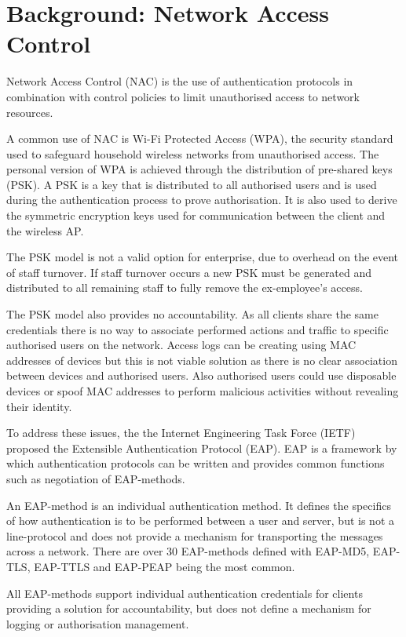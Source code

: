 \chapter{Background: Network Access Control}
Network Access Control (NAC) is the use of authentication protocols in combination with control policies to limit unauthorised access to network resources. \cite{cisco_why_nac}

A common use of NAC is Wi-Fi Protected Access (WPA), the security standard used to safeguard household wireless networks from unauthorised access. The personal version of WPA is achieved through the distribution of pre-shared keys (PSK). A PSK is a key that is distributed to all authorised users and is used during the authentication process to prove authorisation. It is also used to derive the symmetric encryption keys used for communication between the client and the wireless AP.

The PSK model is not a valid option for enterprise\cite{juniper_psk}, due to overhead on the event of staff turnover. If staff turnover occurs a new PSK must be generated and distributed to all remaining staff to fully remove the ex-employee's access. 

The PSK model also provides no accountability. As all clients share the same credentials there is no way to associate performed actions and traffic to specific authorised users on the network. Access logs can be creating using MAC addresses of devices but this is not viable solution as there is no clear association between devices and authorised users. Also authorised users could use disposable devices or spoof MAC addresses to perform malicious activities without revealing their identity.

To address these issues, the the Internet Engineering Task Force (IETF)\cite{ietf} proposed the Extensible Authentication Protocol (EAP)\cite{rfc_3748}. EAP is a framework by which authentication protocols can be written and provides common functions such as negotiation of EAP-methods.

An EAP-method is an individual authentication method. It defines the specifics of how authentication is to be performed between a user and server, but is not a line-protocol and does not provide a mechanism for transporting the messages across a network. There are over 30 EAP-methods defined with EAP-MD5, EAP-TLS, EAP-TTLS and EAP-PEAP being the most common.

All EAP-methods support individual authentication credentials for clients providing a solution for accountability, but does not define a mechanism for logging or authorisation management.

